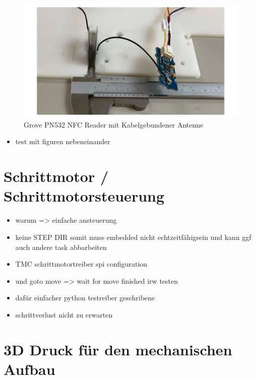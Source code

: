 \begin{figure}
\centering
\includegraphics{images/ATC_nfc_range_test.png}
\caption{Grove PN532 NFC Reader mit Kabelgebundener Antenne
\label{ATC_nfc_range_test}}
\end{figure}

\begin{itemize}
\tightlist
\item
  test mit figuren nebeneinander
\end{itemize}

\hypertarget{schrittmotor-schrittmotorsteuerung}{%
\section{Schrittmotor /
Schrittmotorsteuerung}\label{schrittmotor-schrittmotorsteuerung}}

\begin{itemize}
\tightlist
\item
  warum =\textgreater{} einfache ansteuerung
\item
  keine STEP DIR somit muss embedded nicht echtzeitfähigsein und kann
  ggf auch andere task abbarbeiten
\item
  TMC schrittmotortreiber spi configuration
\item
  und goto move =\textgreater{} wait for move finished irw testen
\item
  dafür einfacher python testreiber geschribene
\item
  schrittverlust nicht zu erwarten
\end{itemize}

\hypertarget{d-druck-fuxfcr-den-mechanischen-aufbau}{%
\section{3D Druck für den mechanischen
Aufbau}\label{d-druck-fuxfcr-den-mechanischen-aufbau}}

